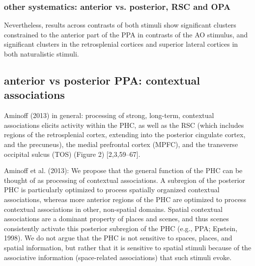 \documentclass[english]{article}
\begin{document}
\subsubsection{other systematics: anterior vs. posterior, RSC and OPA}

Nevertheless, results across contrasts of both stimuli show significant clusters
constrained to the anterior part of the PPA in contrasts of the AO stimulus, and
significant clusters in the retrosplenial cortices and superior lateral cortices
in both naturalistic stimuli.

\subsection{anterior vs posterior PPA: contextual associations}


Aminoff (2013) in general: processing of strong,
long-term, contextual associations elicits activity within the PHC, as well as
the RSC (which includes regions of the retrosplenial cortex, extending into the
posterior cingulate cortex, and the precuneus), the medial prefrontal cortex
(MPFC), and the transverse occipital sulcus (TOS) (Figure 2) [2,3,59–67].

Aminoff et al. (2013): We propose that the general function of the PHC can be
thought of as processing of contextual associations. A subregion of the
posterior PHC is particularly optimized to process spatially organized
contextual associations, whereas more anterior regions of the PHC are optimized
to process contextual associations in other, non-spatial domains.
Spatial contextual associations are a dominant property of places and scenes,
and thus scenes consistently activate this posterior subregion of the PHC (e.g.,
PPA; Epstein, 1998). We do not argue that the PHC is not sensitive to
spaces, places, and spatial information, but rather that it is sensitive to
spatial stimuli because of the associative information (space-related
associations) that such stimuli evoke.
\end{document}
